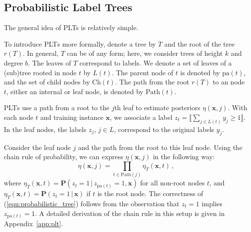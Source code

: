 \documentclass{article}
\newcommand{\Algo}[1]{\textsc{#1}}
\renewcommand{\vec}[1]{\boldsymbol{#1}}
\newcommand{\bx}{\vec{x}}
\newcommand{\pa}[1]{\mathrm{pa}(#1)}
\newcommand{\Path}[1]{\mathrm{Path}(#1)}
\newcommand{\Children}[1]{\mathrm{Ch}(#1)}
\newcommand{\prob}{\mathbf{P}}
\newcommand{\assert}[1]{\llbracket #1 \rrbracket}
\newcommand{\given}{\, | \,}
\newcommand{\sectionBefore}{-0pt}
\newcommand{\sectionAfter}{-0pt}
\begin{document}
\vspace{\sectionBefore}
\subsection{Probabilistic Label Trees}
\vspace{\sectionAfter}

The general idea of PLTs is relatively simple. 

To introduce \Algo{PLT}s more formally, denote a tree by $T$ and the root of the tree $r(T)$. In general, $T$ can be of any form; here, we consider trees of height $k$ and degree $b$. 
The leaves of $T$ correspond to labels. We denote a set of leaves of a (sub)tree rooted in node $t$ by $L(t)$. %
The parent node of $t$ is denoted by $\pa{t}$, and the set of child nodes by $\Children{t}$. The path from the root $r(T)$ to an node $t$, either an internal or leaf node, is denoted by $\Path{t}$. %

\Algo{PLT}s use a path from a root to the $j$\/th leaf to estimate posteriors $\eta(\bx, j)$. %
With each node $t$ and training instance $\bx$, we associate a label $z_t = \assert{\textstyle \sum_{j \in L(t)} y_j \ge 1}$.
In the leaf nodes, the labels $z_j$, $j \in L$, correspond to the original labels $y_j$.

Consider the leaf node $j$ and the path from the root to this leaf node. Using the chain rule of probability, we can express $\eta(\bx, j)$ in the following way:
\begin{equation}
\eta(\bx, j) = \prod_{t \in \Path{j}} \eta_T(\bx, t)\,,
\label{eqn:probabilistic_tree}
\end{equation}
where $\eta_T(\bx, t) = \prob(z_t = 1 \given z_{\pa{t}} =1, \bx)$ for all non-root nodes $t$, and $\eta_T(\bx, t) = \prob(z_t = 1 \given \bx)$ if $t$ is the root node. 
The correctness of (\ref{eqn:probabilistic_tree}) follows from the observation that $z_{t} = 1$ implies $z_{\pa{t}} = 1$. A detailed derivation of the chain rule in this setup is given in Appendix~\ref{app:plt}.
\end{document}
